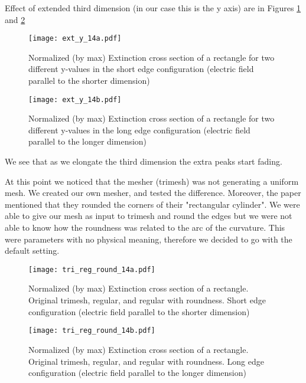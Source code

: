 Effect of extended third dimension (in our case this is the y axis) are in Figures \ref{fig:ext_y_14a} and
\ref{fig:ext_y_14b}

\begin{figure}
    \centering
    \texttt{[image: ext\_y\_14a.pdf]} 
    \caption{Normalized (by max) Extinction cross section of a rectangle for two different y-values in the 
    short edge configuration (electric field parallel to the shorter dimension)}
    \label{fig:ext_y_14a}
 \end{figure}

 \begin{figure}
    \centering
    \texttt{[image: ext\_y\_14b.pdf]} 
    \caption{Normalized (by max) Extinction cross section of a rectangle for two different y-values in the 
    long edge configuration (electric field parallel to the longer dimension)}
    \label{fig:ext_y_14b}
 \end{figure}

We see that as we elongate the third dimension the extra peaks start fading. 

At this point we noticed that the mesher (trimesh) was not generating a uniform mesh. We created our 
own mesher, and tested the difference. Moreover, the paper mentioned that they rounded the corners of their
"rectangular cylinder". We were able to give our mesh as input to trimesh and round the edges but we were not able 
to know how the roundness was related to the arc of the curvature. This were parameters with no physical meaning, 
therefore we decided to go with the default setting. 


\begin{figure}
    \centering
    \texttt{[image: tri\_reg\_round\_14a.pdf]} 
    \caption{Normalized (by max) Extinction cross section of a rectangle. Original trimesh, regular, and regular with 
    roundness. Short edge configuration (electric field parallel to the shorter dimension)}
    \label{fig:tri_reg_round_14a}
 \end{figure}

 \begin{figure}
    \centering
    \texttt{[image: tri\_reg\_round\_14b.pdf]} 
    \caption{Normalized (by max) Extinction cross section of a rectangle.  Original trimesh, regular, and regular with 
    roundness. Long edge configuration (electric field parallel to the longer dimension)}
    \label{fig:tri_reg_round_14b}
 \end{figure}


